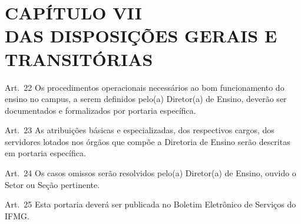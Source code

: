 \documentclass[a4paper,12pt]{report}
\begin{document}

\section{CAPÍTULO VII \\ DAS DISPOSIÇÕES GERAIS E TRANSITÓRIAS}

Art.~22 Os procedimentos operacionais necessários ao bom funcionamento do ensino no campus, 
a serem definidos pelo(a) Diretor(a) de Ensino, deverão ser documentados e formalizados 
por portaria específica.  

Art.~23 As atribuições básicas e especializadas, dos respectivos cargos, dos servidores 
lotados nos órgãos que compõe a Diretoria de Ensino serão descritas em portaria específica.

Art.~24 Os casos omissos serão resolvidos pelo(a) Diretor(a) de Ensino, ouvido o Setor ou Seção pertinente.

Art.~25 Esta portaria deverá ser publicada no Boletim Eletrônico de Serviços do IFMG.
\end{document}
